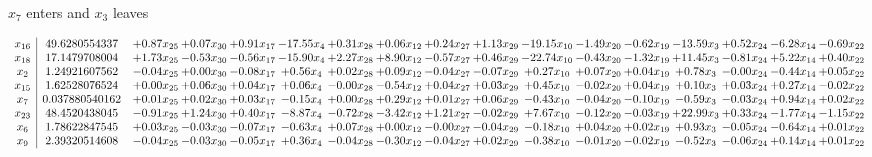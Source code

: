 \documentclass[9pt]{article}
\begin{document}
 $ x_{7} $ enters and $ x_{3} $ leaves 

 \[\begin{array}{c| c c@{\hskip 2pt} c@{\hskip 2pt} c@{\hskip 2pt} c@{\hskip 2pt} c@{\hskip 2pt} c@{\hskip 2pt} c@{\hskip 2pt} c@{\hskip 2pt} c@{\hskip 2pt} c@{\hskip 2pt} c@{\hskip 2pt} c@{\hskip 2pt} c@{\hskip 2pt} c@{\hskip 2pt} c@{\hskip 2pt} }
 x_{16}   &  49.6280554337 & +  0.87 x_{25} & +  0.07 x_{30} & +  0.91 x_{17} & -17.55 x_{4} & +  0.31 x_{28} & +  0.06 x_{12} & +  0.24 x_{27} & +  1.13 x_{29} & -19.15 x_{10} & -1.49 x_{20} & -0.62 x_{19} & -13.59 x_{3} & +  0.52 x_{24} & -6.28 x_{14} & -0.69 x_{22}\\
 x_{18}   &  17.1479708004 & +  1.73 x_{25} & -0.53 x_{30} & -0.56 x_{17} & -15.90 x_{4} & +  2.27 x_{28} & +  8.90 x_{12} & -0.57 x_{27} & +  0.46 x_{29} & -22.74 x_{10} & -0.43 x_{20} & -1.32 x_{19} & + 11.45 x_{3} & -0.81 x_{24} & +  5.22 x_{14} & +  0.40 x_{22}\\
 x_{2}   &  1.24921607562 & -0.04 x_{25} & +  0.00 x_{30} & -0.08 x_{17} & +  0.56 x_{4} & +  0.02 x_{28} & +  0.09 x_{12} & -0.04 x_{27} & -0.07 x_{29} & +  0.27 x_{10} & +  0.07 x_{20} & +  0.04 x_{19} & +  0.78 x_{3} & -0.00 x_{24} & -0.44 x_{14} & +  0.05 x_{22}\\
 x_{15}   &  1.62528076524 & +  0.00 x_{25} & +  0.06 x_{30} & +  0.04 x_{17} & +  0.06 x_{4} & -0.00 x_{28} & -0.54 x_{12} & +  0.04 x_{27} & +  0.03 x_{29} & +  0.45 x_{10} & -0.02 x_{20} & +  0.04 x_{19} & +  0.10 x_{3} & +  0.03 x_{24} & +  0.27 x_{14} & -0.02 x_{22}\\
 x_{7}   &  0.037880540162 & +  0.01 x_{25} & +  0.02 x_{30} & +  0.03 x_{17} & -0.15 x_{4} & +  0.00 x_{28} & +  0.29 x_{12} & +  0.01 x_{27} & +  0.06 x_{29} & -0.43 x_{10} & -0.04 x_{20} & -0.10 x_{19} & -0.59 x_{3} & -0.03 x_{24} & +  0.94 x_{14} & +  0.02 x_{22}\\
 x_{23}   &  48.4520438045 & -0.91 x_{25} & +  1.24 x_{30} & +  0.40 x_{17} & -8.87 x_{4} & -0.72 x_{28} & -3.42 x_{12} & +  1.21 x_{27} & -0.02 x_{29} & +  7.67 x_{10} & -0.12 x_{20} & -0.03 x_{19} & + 22.99 x_{3} & +  0.33 x_{24} & -1.77 x_{14} & -1.15 x_{22}\\
 x_{6}   &  1.78622847545 & +  0.03 x_{25} & -0.03 x_{30} & -0.07 x_{17} & -0.63 x_{4} & +  0.07 x_{28} & +  0.00 x_{12} & -0.00 x_{27} & -0.04 x_{29} & -0.18 x_{10} & +  0.04 x_{20} & +  0.02 x_{19} & +  0.93 x_{3} & -0.05 x_{24} & -0.64 x_{14} & +  0.01 x_{22}\\
 x_{9}   &  2.39320514608 & -0.04 x_{25} & -0.03 x_{30} & -0.05 x_{17} & +  0.36 x_{4} & -0.04 x_{28} & -0.30 x_{12} & -0.04 x_{27} & +  0.02 x_{29} & -0.38 x_{10} & -0.01 x_{20} & -0.02 x_{19} & -0.52 x_{3} & -0.06 x_{24} & +  0.14 x_{14} & +  0.01 x_{22}\\

\end{array}\]
\end{document}
